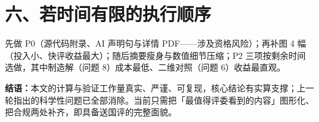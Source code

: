 \documentclass[12pt,a4paper]{ctexart}
\begin{document}
\section{六、若时间有限的执行顺序}

先做 P0（源代码附录、AI 声明句与详情 PDF——涉及资格风险）；再补图 4 幅（投入小、快评收益最大）；随后摘要瘦身与数值细节压缩；P2 三项按剩余时间选做，其中制造解（问题 8）成本最低、二维对照（问题 6）收益最直观。

\vspace{1em}
\noindent\textbf{结语：}本文的计算与验证工作量真实、严谨、可复现，核心结论有实算支撑；上一轮指出的科学性问题已全部消除。当前只需把「最值得评委看到的内容」图形化、把合规两处补齐，即具备送国评的完整面貌。
\end{document}
